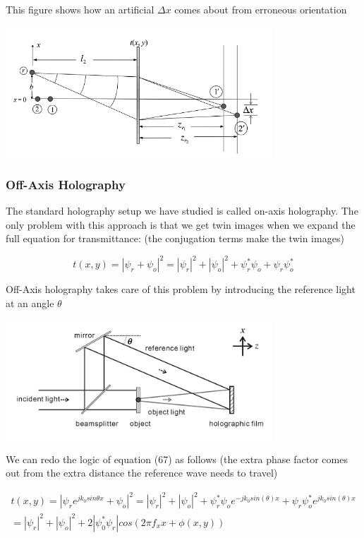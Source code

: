 \documentclass[12pt]{article}
\begin{document}
This figure shows how an artificial \(\Delta x\) comes about from erroneous orientation

\begin{center}
\includegraphics[width=100mm]{tupac13.png}
\end{center}

\subsubsection{Off-Axis Holography}

The standard holography setup we have studied is called on-axis holography.
The only problem with this approach is that we get twin images when we expand
the full equation for transmittance: (the conjugation terms make the twin images)

\begin{equation}
	t(x,y) = |\psi_{r} + \psi_{o}|^2 = |\psi_{r}|^2 + |\psi_{o}|^2
	 + \psi_{r}^*\psi_{o} + \psi_{r}\psi_{o}^*
\end{equation}

Off-Axis holography takes care of this problem by introducing the reference
light at an angle \(\theta\)

\begin{center}
\includegraphics[width=100mm]{tupac9.png}
\end{center}

We can redo the logic of equation (67) as follows (the extra phase factor comes
out from the extra distance the reference wave needs to travel)

\begin{equation}
	\begin{multlined}
	t(x,y) = |\psi_{r}e^{jk_{0}sin\theta x} + \psi_{o}|^2 = |\psi_{r}|^2 + |\psi_{o}|^2
         + \psi_{r}^*\psi_{o}e^{-jk_{0}sin(\theta) x} + \psi_{r}\psi_{o}^*e^{jk_{0}sin(\theta)x}
	\\=|\psi_{r}|^2 + |\psi_{o}|^2 + 2|\psi_{0}^*\psi_{r}|cos(2\pi f_{x}x + \phi (x,y))
	\end{multlined}
\end{equation}
\end{document}
